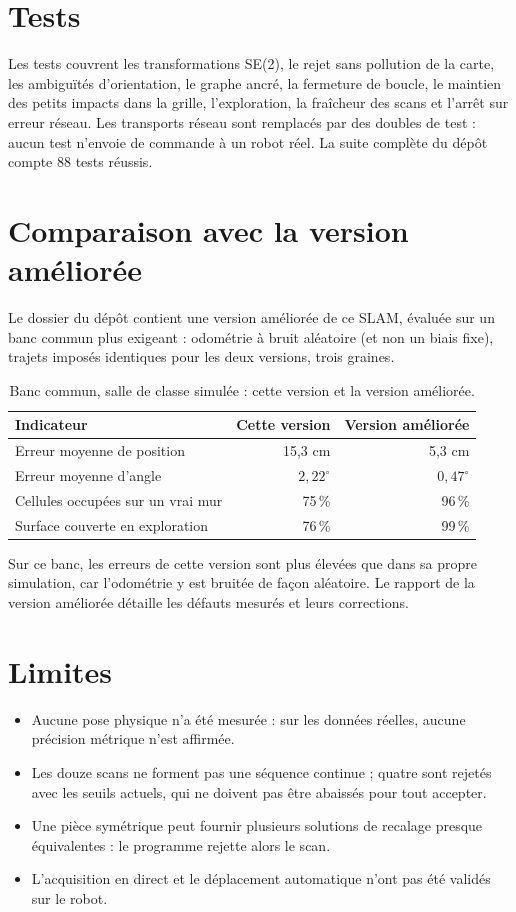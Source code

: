 \documentclass[11pt,a4paper]{article}
\newcommand{\code}[1]{\texttt{\detokenize{#1}}}
\begin{document}
\section{Tests}
Les tests couvrent les transformations SE(2), le rejet sans pollution de la
carte, les ambiguïtés d'orientation, le graphe ancré, la fermeture de boucle,
le maintien des petits impacts dans la grille, l'exploration, la fraîcheur
des scans et l'arrêt sur erreur réseau. Les transports réseau sont remplacés
par des doubles de test : aucun test n'envoie de commande à un robot réel.
La suite complète du dépôt compte 88 tests réussis.

\section{Comparaison avec la version améliorée}
Le dossier \code{upgrade code with IA} du dépôt contient une version
améliorée de ce SLAM, évaluée sur un banc commun plus exigeant : odométrie à
bruit aléatoire (et non un biais fixe), trajets imposés identiques pour les
deux versions, trois graines.

\begin{table}[htbp]
\centering
\caption{Banc commun, salle de classe simulée : cette version et la version
améliorée.}
\begin{tabular}{lrr}
\toprule
Indicateur & Cette version & Version améliorée \\
\midrule
Erreur moyenne de position & 15,3 cm & 5,3 cm \\
Erreur moyenne d'angle & $2,22^\circ$ & $0,47^\circ$ \\
Cellules occupées sur un vrai mur & 75\,\% & 96\,\% \\
Surface couverte en exploration & 76\,\% & 99\,\% \\
\bottomrule
\end{tabular}
\end{table}

Sur ce banc, les erreurs de cette version sont plus élevées que dans sa
propre simulation, car l'odométrie y est bruitée de façon aléatoire. Le
rapport de la version améliorée détaille les défauts mesurés et leurs
corrections.

\section{Limites}
\begin{itemize}
\item Aucune pose physique n'a été mesurée : sur les données réelles, aucune
précision métrique n'est affirmée.
\item Les douze scans ne forment pas une séquence continue ; quatre sont
rejetés avec les seuils actuels, qui ne doivent pas être abaissés pour tout
accepter.
\item Une pièce symétrique peut fournir plusieurs solutions de recalage
presque équivalentes : le programme rejette alors le scan.
\item L'acquisition en direct et le déplacement automatique n'ont pas été
validés sur le robot.
\end{itemize}
\end{document}
